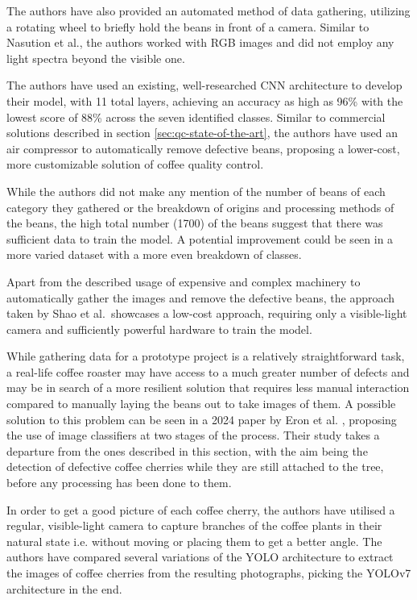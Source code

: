 The authors have also provided an automated method of data gathering, utilizing a rotating wheel to briefly hold the beans
in front of a camera.
Similar to Nasution et al.\cite{manyRoastLevelsNasution}, the authors worked with RGB images and did not employ any
light spectra beyond the visible one.

The authors have used an existing, well-researched CNN architecture to develop their model, with 11 total layers,
achieving an accuracy as high as 96\% with the lowest score of 88\% across the seven identified classes.
Similar to commercial solutions described in section \ref{sec:qc-state-of-the-art}, the authors have used an air compressor
to automatically remove defective beans, proposing a lower-cost, more customizable solution of coffee quality control.

While the authors did not make any mention of the number of beans of each category they gathered or the breakdown of origins
and processing methods of the beans, the high total number (1700) of the beans suggest that there was sufficient data to train the model.
A potential improvement could be seen in a more varied dataset with a more even breakdown of classes.

Apart from the described usage of expensive and complex machinery to automatically gather the images and remove the defective beans,
the approach taken by Shao et al.\ showcases a low-cost approach, requiring only a visible-light camera and
sufficiently powerful hardware to train the model.

While gathering data for a prototype project is a relatively straightforward task, a real-life coffee roaster may have
access to a much greater number of defects and may be in search of a more resilient solution that requires less manual interaction
compared to manually laying the beans out to take images of them.
A possible solution to this problem can be seen in a 2024 paper by Eron et al. \cite{eronCoffeeCherryOnTrees}, proposing
the use of image classifiers at two stages of the process.
Their study takes a departure from the ones described in this section, with the aim being the detection of defective
coffee cherries while they are still attached to the tree, before any processing has been done to them.

In order to get a good picture of each coffee cherry, the authors have utilised a regular, visible-light camera to
capture branches of the coffee plants in their natural state i.e. without moving or placing them to get a better angle.
The authors have compared several variations of the YOLO architecture to extract the images of coffee cherries from the
resulting photographs, picking the YOLOv7 architecture in the end.

